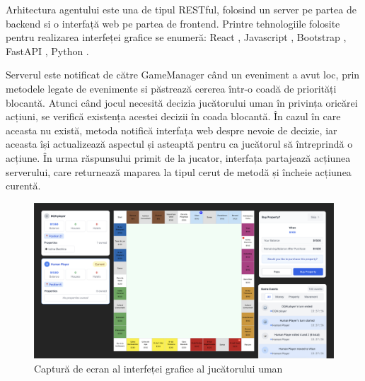 Arhitectura agentului este una de tipul RESTful, folosind un server pe partea de backend si o interfață web pe partea de frontend. Printre tehnologiile folosite pentru realizarea interfeței grafice se enumeră: React \cite{react_dev}, Javascript \cite{mdn_javascript}, Bootstrap \cite{bootstrap}, FastAPI \cite{fastapi}, Python \cite{python_org}.

Serverul este notificat de către GameManager când un eveniment a avut loc, prin metodele legate de evenimente si păstrează cererea într-o coadă de priorități blocantă. Atunci când jocul necesită decizia jucătorului uman în privința oricărei acțiuni, se verifică existența acestei decizii în coada blocantă. În cazul în care aceasta nu există, metoda notifică interfața web despre nevoie de decizie, iar aceasta își actualizează aspectul și asteaptă pentru ca jucătorul să întreprindă o acțiune. În urma răspunsului primit de la jucator, interfața partajează acțiunea serverului, care returnează maparea la tipul cerut de metodă și încheie acțiunea curentă.

\begin{figure}[H]
    \centering
    \includegraphics[width=16cm]{images/screenshot_GUI.png}
    \caption{Captură de ecran al interfeței grafice al jucătorului uman}
    \label{fig:screenshot-human-player-gui}
\end{figure}